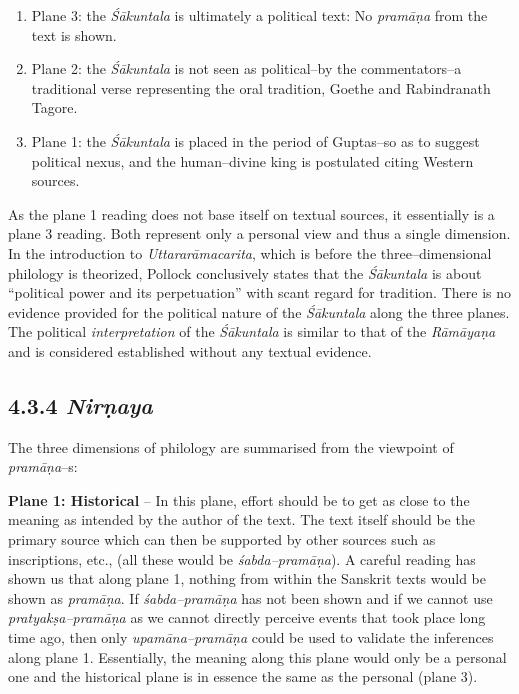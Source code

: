 \newpage

\begin{enumerate}
\itemsep=0pt
\item Plane 3: the \textit{Śākuntala }is ultimately a political text: No \textit{pramāṇa} from the text is shown.

 \item Plane 2: the \textit{Śākuntala} is not seen as political–by the commentators–a traditional verse representing the oral tradition, Goethe and Rabindranath Tagore.

 \item Plane 1: the \textit{Śākuntala} is placed in the period of Guptas–so as to suggest political nexus, and the human–divine king is postulated citing Western sources.

\end{enumerate}

As the plane 1 reading does not base itself on textual sources, it essentially is a plane 3 reading. Both represent only a personal view and thus a single dimension. In the introduction to \textit{Uttararāmacarita}, which is before the three–dimensional philology is theorized, Pollock conclusively states that the \textit{Śākuntala }is about “political power and its perpetuation” with scant regard for tradition. There is no evidence provided for the political nature of the \textit{Śākuntala} along the three planes. The political \textit{interpretation} of the \textit{Śākuntala }is similar to that of the \textit{Rāmāyaṇa} and is considered established without any textual evidence.

\vspace{-.3cm}

\subsection*{4.3.4 {\it {\bfseries Nirṇaya}}}

The three dimensions of philology are summarised from the viewpoint of \textit{pramāṇa}–s:

\textbf{Plane 1: Historical} – In this plane, effort should be to get as close to the meaning as intended by the author of the text. The text itself should be the primary source which can then be supported by other sources such as inscriptions, etc., (all these would be \textit{śabda–pramāṇa}). A careful reading has shown us that along plane 1, nothing from within the Sanskrit texts would be shown as \textit{pramāṇa}. If \textit{śabda–pramāṇa} has not been shown and if we cannot use \textit{pratyakṣa–pramāṇa} as we cannot directly perceive events that took place long time ago, then only\textit{ upamāna–pramāṇa} could be used to validate the inferences along plane 1. Essentially, the meaning along this plane would only be a personal one and the historical plane is in essence the same as the personal (plane 3).


